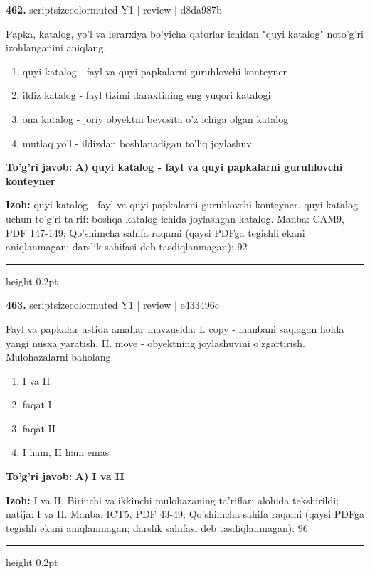 \documentclass[10pt,a4paper]{article}
\begin{document}
{\bfseries\sffamily\color{ink} 462.} {scriptsizecolor{muted} Y1 | review | d8da987b}
\par
Papka, katalog, yo'l va ierarxiya bo'yicha qatorlar ichidan "quyi katalog" noto'g'ri izohlanganini aniqlang.
\begin{enumerate}[label=\Alph*),leftmargin=9mm]
\item quyi katalog - fayl va quyi papkalarni guruhlovchi konteyner
\item ildiz katalog - fayl tizimi daraxtining eng yuqori katalogi
\item ona katalog - joriy obyektni bevosita o'z ichiga olgan katalog
\item mutlaq yo'l - ildizdan boshlanadigan to'liq joylashuv
\end{enumerate}
\begin{tcolorbox}[enhanced,breakable,colback=teal!4,colframe=teal!60!black,boxrule=0.45pt,arc=1.2mm,left=2.7mm,right=2.7mm,top=1.8mm,bottom=1.8mm,before skip=2mm,after skip=2mm]
{\bfseries\sffamily\color{teal}To'g'ri javob:} \textbf{A) quyi katalog - fayl va quyi papkalarni guruhlovchi konteyner}
\par\smallskip
{\bfseries Izoh:} quyi katalog - fayl va quyi papkalarni guruhlovchi konteyner. quyi katalog uchun to'g'ri ta'rif: boshqa katalog ichida joylashgan katalog. Manba: CAM9, PDF 147-149; Qo'shimcha sahifa raqami (qaysi PDFga tegishli ekani aniqlanmagan; darslik sahifasi deb tasdiqlanmagan): 92
\end{tcolorbox}
\vspace{2mm}\hrule height 0.2pt\vspace{3mm}

{\bfseries\sffamily\color{ink} 463.} {scriptsizecolor{muted} Y1 | review | e433496c}
\par
Fayl va papkalar ustida amallar mavzusida: I. copy - manbani saqlagan holda yangi nusxa yaratish. II. move - obyektning joylashuvini o'zgartirish. Mulohazalarni baholang.
\begin{enumerate}[label=\Alph*),leftmargin=9mm]
\item I va II
\item faqat I
\item faqat II
\item I ham, II ham emas
\end{enumerate}
\begin{tcolorbox}[enhanced,breakable,colback=teal!4,colframe=teal!60!black,boxrule=0.45pt,arc=1.2mm,left=2.7mm,right=2.7mm,top=1.8mm,bottom=1.8mm,before skip=2mm,after skip=2mm]
{\bfseries\sffamily\color{teal}To'g'ri javob:} \textbf{A) I va II}
\par\smallskip
{\bfseries Izoh:} I va II. Birinchi va ikkinchi mulohazaning ta'riflari alohida tekshirildi; natija: I va II. Manba: ICT5, PDF 43-49; Qo'shimcha sahifa raqami (qaysi PDFga tegishli ekani aniqlanmagan; darslik sahifasi deb tasdiqlanmagan): 96
\end{tcolorbox}
\vspace{2mm}\hrule height 0.2pt\vspace{3mm}
\end{document}
